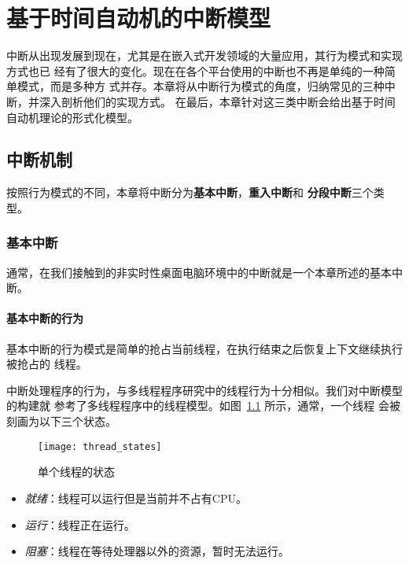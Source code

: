 
\chapter{基于时间自动机的中断模型}
\label{cha:intr}

中断从出现发展到现在，尤其是在嵌入式开发领域的大量应用，其行为模式和实现方式也已
经有了很大的变化。现在在各个平台使用的中断也不再是单纯的一种简单模式，而是多种方
式并存。本章将从中断行为模式的角度，归纳常见的三种中断，并深入剖析他们的实现方式。
在最后，本章针对这三类中断会给出基于时间自动机理论的形式化模型。

\section{中断机制}
\label{sec:intr_machanism}

按照行为模式的不同，本章将中断分为\textbf{基本中断}，\textbf{重入中断}和
\textbf{分段中断}三个类型。

\subsection{基本中断}
\label{subsec:basic}

通常，在我们接触到的非实时性桌面电脑环境中的中断就是一个本章所述的基本中断。

\subsubsection{基本中断的行为}
\label{subsubsec:basic_behavior}

基本中断的行为模式是简单的抢占当前线程，在执行结束之后恢复上下文继续执行被抢占的
线程。

中断处理程序的行为，与多线程程序研究中的线程行为十分相似。我们对中断模型的构建就
参考了多线程程序中的线程模型。如图~\ref{fig:thread_state} 所示，通常，一个线程
会被刻画为以下三个状态。

\begin{figure}[H]
	\centering
	\texttt{[image: thread\_states]}
	\caption{单个线程的状态}
	\label{fig:thread_state}
\end{figure}

\begin{itemize}
	\item \emph{就绪}：线程可以运行但是当前并不占有CPU。
	\item \emph{运行}：线程正在运行。
	\item \emph{阻塞}：线程在等待处理器以外的资源，暂时无法运行。
\end{itemize}

